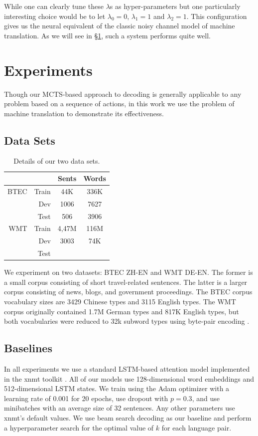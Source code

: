 \documentclass[11pt,a4paper]{article}
\begin{document}
While one can clearly tune these $\lambda$s as
hyper-parameters but one particularly interesting choice would be to let
$\lambda_0 = 0$, $\lambda_1 = 1$ and $\lambda_2 = 1$. This configuration gives
us the neural equivalent of the classic noisy channel model of machine
translation. As we will see in \S\ref{sec:experiments}, such a system performs
quite well.

\section{Experiments}
\label{sec:experiments}
Though our MCTS-based approach to decoding is generally applicable to any
problem based on a sequence of actions, in this work we use the problem
of machine translation to demonstrate its effectiveness.

\subsection{Data Sets}
\begin{table}
\centering
\begin{tabular}{r r c c}
\toprule
& & Sents & Words \\
\midrule
BTEC & Train & 44K & 336K \\
& Dev & 1006 & 7627 \\
& Test & 506 & 3906 \\
\midrule
WMT & Train & 4,47M & 116M \\
& Dev & 3003 & 74K \\
& Test & & \\
\bottomrule
\end{tabular}
\caption{Details of our two data sets.}
\label{tab:data_sets}
\end{table}

We experiment on two datasets: BTEC ZH-EN and WMT DE-EN. The former is a small
corpus consisting of short travel-related sentences. The latter is a larger
corpus consisting of news, blogs, and government proceedings. The BTEC corpus
vocabulary sizes are 3429 Chinese types and 3115 English types. The WMT corpus
originally contained 1.7M German types and 817K English types, but both
vocabularies were reduced to 32k subword types using byte-pair encoding
\cite{sennrich2015neural}.

\subsection{Baselines}
In all experiments we use a standard LSTM-based attention model
\cite{bahdanau2014neural} implemented in the xnmt toolkit
\cite{neubig2018xnmt}. All of our models use 128-dimensional word embeddings
and 512-dimensional LSTM states. We train using the Adam optimizer
\cite{kingma2014adam} with a learning rate of 0.001 for 20 epochs, use dropout
\cite{srivastava2014dropout} with $p=0.3$, and use minibatches with an average
size of 32 sentences. Any other parameters use xnmt's default values. We use
beam search decoding as our baseline and perform a hyperparameter search for
the optimal value of $k$ for each language pair.
\end{document}
